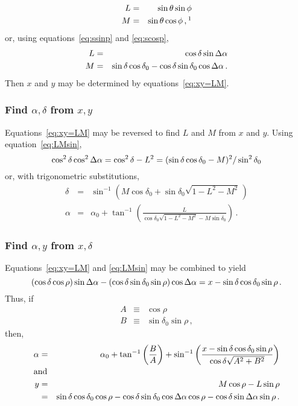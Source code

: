 \begin{eqnarray*}
  L & = & \sin\theta\sin\phi \\
  M & = & \sin\theta\cos\phi \, , \footnotemark
\end{eqnarray*}
or, using equations~\ref{eq:ssinp} and \ref{eq:scosp},
\begin{eqnarray}
 L & = &\cos\delta\sin\Delta\alpha    \nonumber \\
 M & = &\sin\delta\cos\delta_0 - \cos\delta\sin\delta_0\cos
          \Delta\alpha \, .  \label{eq:LMsin}
\end{eqnarray}
Then $x$ and $y$ may be determined by equations~\ref{eq:xy=LM}.

\subsubsection{Find $\alpha,\delta$ from $x,y$}

Equations~\ref{eq:xy=LM} may be reversed to find $L$ and $M$ from $x$ and
$y$.  Using equation~\ref{eq:LMsin},
\begin{displaymath}
  \cos^2\delta\cos^2\Delta\alpha=\cos^2\delta-L^2=(\sin\delta\cos
       \delta_0-M)^2/\sin^2\delta_0
\end{displaymath}
or, with trigonometric substitutions,
\begin{eqnarray*}
  \delta & = &\sin^{-1} \left( M\cos\delta_0 + \sin\delta_0
               \sqrt{1-L^2-M^2} \, \right) \\
   \alpha & = &\alpha_0+\tan^{-1} \left( \frac{L}{\cos\delta_0
               \sqrt{1-L^2-M^2}-M\sin\delta_0}\right) \, .
\end{eqnarray*}

\subsubsection{Find $\alpha,y$ from $x,\delta$}

Equations~\ref{eq:xy=LM} and \ref{eq:LMsin} may be combined to yield
\begin{displaymath}
  (\cos\delta\cos\rho)\sin\Delta\alpha -(\cos\delta\sin\delta_0\sin\rho)
      \cos\Delta\alpha  = x - \sin\delta\cos\delta_0\sin\rho \, .
\end{displaymath}
Thus, if
\begin{eqnarray*}
  A & \equiv &\cos\rho \\
  B & \equiv &\sin\delta_0\sin\rho \, ,
\end{eqnarray*}
then,
\begin{eqnarray*}
  \alpha & = & \alpha_0 + \tan^{-1}\left(\frac{B}{A}\right) +
    \sin^{-1}\left( \frac{x-\sin\delta\cos\delta_0\sin\rho}{\cos
    \delta\sqrt{A^2+B^2}}\right) \\
\noalign{\hbox{and}}
  y & = &M\cos\rho - L\sin\rho \\
    & = &\sin\delta\cos\delta_0\cos\rho - \cos\delta\sin\delta_0
    \cos\da\cos\rho-\cos\delta\sin\da\sin\rho \, .
\end{eqnarray*}

